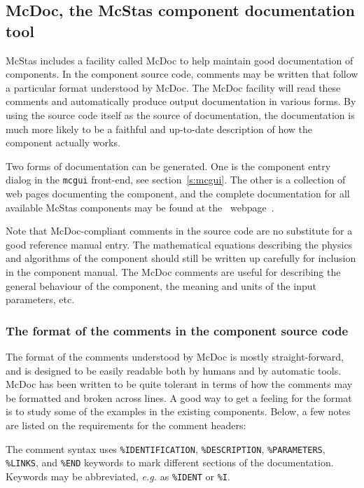 {


\subsection{McDoc, the McStas component documentation tool}
\label{s:mcdoc}

McStas includes a facility called McDoc to help
maintain good documentation of components. In the component source code,
comments may be written that follow a particular format understood by
McDoc. The McDoc facility will read these comments and automatically
produce output documentation in various forms. By using the source code
itself as the source of documentation, the documentation is much more
likely to be a faithful and up-to-date description of how the component
actually works.

Two forms of documentation can be generated. One
is the component entry dialog in the \verb+mcgui+ front-end, see
section~\ref{s:mcgui}. The other is a collection of web pages documenting
the component, and the complete documentation for all available
McStas components may be found at the \MCS\ webpage~\cite{mcstas_webpage}.

Note that McDoc-compliant comments in the source code are no substitute
for a good reference manual entry. The mathematical equations describing
the physics and algorithms of the component should still be written up
carefully for inclusion in the component manual. The McDoc comments are
useful for describing the general behaviour of the component, the
meaning and units of the input parameters, etc.


\subsubsection{The format of the comments in the component source code}

The format of the comments understood by McDoc is mostly
straight-forward, and is designed to be easily readable both by humans
and by automatic tools. McDoc has been written to be quite tolerant in
terms of how the comments may be formatted and broken across lines. A
good way to get a feeling for the format is to study some of the examples
in the existing components. Below, a few
notes are listed on the requirements for the comment headers:

The comment syntax uses \verb+%IDENTIFICATION+, \verb+%DESCRIPTION+,
\verb+%PARAMETERS+, \verb+%LINKS+, and \verb+%END+
keywords to mark different sections of the documentation. Keywords may
be abbreviated, \textit{e.g.} as \verb+%IDENT+ or \verb+%I+.

}
